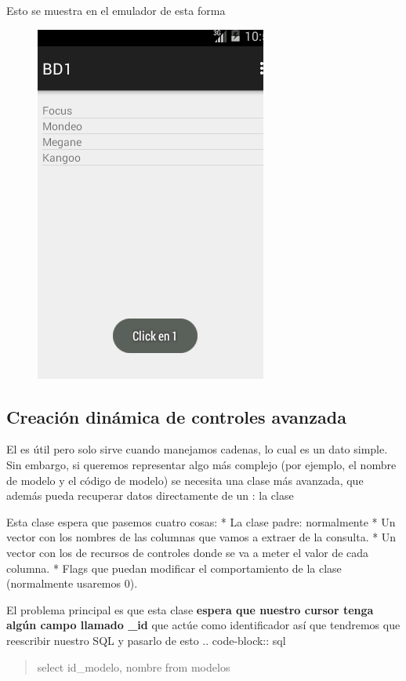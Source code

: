\documentclass[a4paper,12pt,spanish]{sphinxmanual}
\begin{document}
Esto se muestra en el emulador de esta forma
\begin{figure}[htbp]
\centering

\includegraphics{ListViewDinamico.png}
\end{figure}


\subsection{Creación dinámica de controles avanzada}
\label{tema2:creacion-dinamica-de-controles-avanzada}
El  es útil pero solo sirve cuando manejamos cadenas, lo cual es un dato simple. Sin embargo, si queremos representar algo más complejo (por ejemplo, el nombre de modelo y el código de modelo) se necesita una clase más avanzada, que además pueda recuperar datos directamente de un : la clase 

Esta clase espera que pasemos cuatro cosas:
* La clase padre: normalmente 
* Un vector con los nombres de las columnas que vamos a extraer de la consulta.
* Un vector con los  de recursos de controles donde se va a meter el valor de cada columna.
* Flags que puedan modificar el comportamiento de la clase (normalmente usaremos 0).

El problema principal es que esta clase \textbf{espera que nuestro cursor tenga algún campo llamado \_id} que actúe como identificador así que tendremos que reescribir nuestro SQL y pasarlo de esto
.. code-block:: sql
\begin{quote}

select id\_modelo, nombre from modelos
\end{quote}
\end{document}
